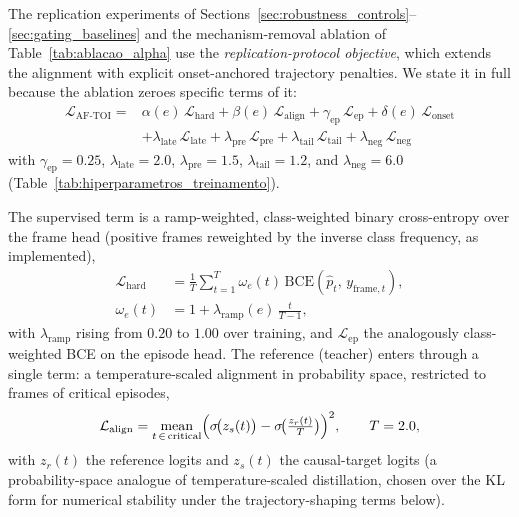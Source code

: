 \documentclass[a4paper,fleqn]{cas-dc}
\begin{document}
{The replication experiments of
Sections~\ref{sec:robustness_controls}--\ref{sec:gating_baselines} and the
mechanism-removal ablation of Table~\ref{tab:ablacao_alpha} use the
\emph{replication-protocol objective}, which extends the alignment with
explicit onset-anchored trajectory penalties. We state it in full because the
ablation zeroes specific terms of it:
\begin{equation}
\begin{aligned}
  \mathcal{L}_{\mathrm{AF\text{-}TOI}} ={}& \alpha(e)\,\mathcal{L}_{\text{hard}}
    + \beta(e)\,\mathcal{L}_{\text{align}}
    + \gamma_{\mathrm{ep}}\,\mathcal{L}_{\text{ep}}
    + \delta(e)\,\mathcal{L}_{\text{onset}} \\
    &+ \lambda_{\text{late}}\,\mathcal{L}_{\text{late}}
    + \lambda_{\text{pre}}\,\mathcal{L}_{\text{pre}}
    + \lambda_{\text{tail}}\,\mathcal{L}_{\text{tail}}
    + \lambda_{\text{neg}}\,\mathcal{L}_{\text{neg}}
\end{aligned}
  \label{eq:perda_total_aftoi}
\end{equation}
with $\gamma_{\mathrm{ep}}{=}0.25$, $\lambda_{\text{late}}{=}2.0$,
$\lambda_{\text{pre}}{=}1.5$, $\lambda_{\text{tail}}{=}1.2$, and
$\lambda_{\text{neg}}{=}6.0$ (Table~\ref{tab:hiperparametros_treinamento}).

The supervised term is a ramp-weighted, class-weighted binary cross-entropy
over the frame head (positive frames reweighted by the inverse class
frequency, as implemented),
\begin{equation}
\begin{aligned}
  \mathcal{L}_{\text{hard}} &= \frac{1}{T}\sum_{t=1}^{T} \omega_e(t)\,
    \mathrm{BCE}\!\left(\hat{p}_t,\, y_{\text{frame},t}\right), \\
  \omega_e(t) &= 1 + \lambda_{\mathrm{ramp}}(e)\,\tfrac{t}{T-1},
\end{aligned}
  \label{eq:perda_hard_aftoi}
\end{equation}
with $\lambda_{\mathrm{ramp}}$ rising from $0.20$ to $1.00$ over training, and
$\mathcal{L}_{\text{ep}}$ the analogously class-weighted BCE on the episode head. The reference
(teacher) enters through a single term: a temperature-scaled alignment in
probability space, restricted to frames of critical episodes,
\begin{equation}
  \mathcal{L}_{\text{align}} = \operatorname*{mean}_{t \,\in\, \text{critical}}
    \Bigl(\sigma\!\bigl(z_s(t)\bigr) -
    \sigma\!\bigl(\tfrac{z_r(t)}{T}\bigr)\Bigr)^{2}, \qquad T = 2.0,
  \label{eq:perda_soft_aftoi}
\end{equation}
with $z_r(t)$ the reference logits and $z_s(t)$ the causal-target logits (a
probability-space analogue of temperature-scaled distillation, chosen over the
KL form for numerical stability under the trajectory-shaping terms below).

}
\end{document}
